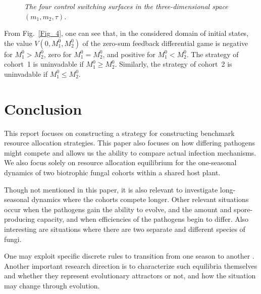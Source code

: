 \documentclass[11pt]{amsart}
\begin{document}
\begin{figure}
\bf \caption{\it The four control switching surfaces in the three-dimensional
space~$ (m_1, m_2, \tau) $.}
\label{Fig_7}
\end{figure}

From Fig.~{\rm \ref{Fig_4},} one can see that{\rm ,} in the considered domain
of initial states{\rm ,} the value $ V \left( 0, M_1^0, M_2^0 \right) $ of
the zero-sum feedback differential game is negative for $ M_1^0 > M_2^0 ${\rm ,}
zero for $ M_1^0 = M_2^0 ${\rm ,} and positive for $ M_1^0 < M_2^0 $. The strategy of cohort~{\rm 1} is uninvadable
if $ M_1^0 \geqslant M_2^0 $. Similarly{\rm ,} the strategy of cohort~{\rm 2} is uninvadable if $ M_1^0
\leqslant M_2^0 $. 


\section{Conclusion}
This report focuses on constructing a strategy for constructing benchmark resource allocation strategies. This paper also focuses on how differing pathogens might compete and allows us the ability to compare actual infection mechanisms.
We also focus solely on resource allocation equilibrium for the one-seasonal dynamics of two biotrophic fungal cohorts within a shared host plant. 

Though not mentioned in this paper, it is also relevant to investigate long-seasonal dynamics where the cohorts compete longer. Other relevant situations occur when the pathogens gain the ability to evolve, and the amount and spore-producing capacity, and when efficiencies of the pathogens begin to differ. Also interesting are situations where there are two separate and different species of fungi.

One may exploit specific discrete rules to
transition from one season to another \cite{MailleretLemesle2009,Akhmetzhanov2012}.
Another important research direction is to characterize such equilibria
themselves and whether they represent evolutionary attractors or not, and how the
situation may change through evolution.
\end{document}
